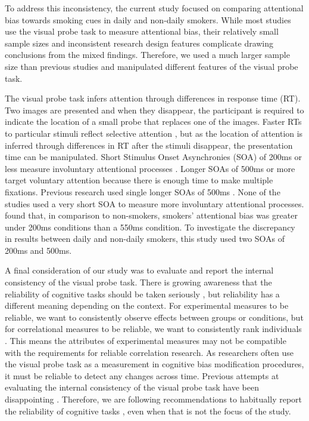 \documentclass[empirical, authordate]{jote-new-article}
\begin{document}
To address this inconsistency, the current study focused on comparing attentional bias towards smoking cues in daily and non-daily smokers. While most studies use the visual probe task to measure attentional bias, their relatively small sample sizes and inconsistent research design features complicate drawing conclusions from the mixed findings. Therefore, we used a much larger sample size than previous studies and manipulated different features of the visual probe task.

The visual probe task infers attention through differences in response time (RT). Two images are presented and when they disappear, the participant is required to indicate the location of a small probe that replaces one of the images. Faster RTs to particular stimuli reflect selective attention \parencite{Field2008}, but as the location of attention is inferred through differences in RT after the stimuli disappear, the presentation time can be manipulated. Short Stimulus Onset Asynchronies (SOA) of 200ms or less measure involuntary attentional processes \parencite{Field2008}. Longer SOAs of 500ms or more target voluntary attention because there is enough time to make multiple fixations. Previous research used single longer SOAs of 500ms \parencite{Vollstädt-Klein2011, Hogarth2003, Mogg2005}. None of the studies used a very short SOA to measure more involuntary attentional processes. \parencite{Chanon2010} found that, in comparison to non-smokers, smokers' attentional bias was greater under 200ms conditions than a 550ms condition. To investigate the discrepancy in results between daily and non-daily smokers, this study used two SOAs of 200ms and 500ms.

A final consideration of our study was to evaluate and report the internal consistency of the visual probe task. There is growing awareness that the reliability of cognitive tasks should be taken seriously \parencite{Parsons2019, Pennington2021}, but reliability has a different meaning depending on the context. For experimental measures to be reliable, we want to consistently observe effects between groups or conditions, but for correlational measures to be reliable, we want to consistently rank individuals \parencite{Hedge2018}. This means the attributes of experimental measures may not be compatible with the requirements for reliable correlation research. As researchers often use the visual probe task as a measurement in cognitive bias modification procedures, it must be reliable to detect any changes across time. Previous attempts at evaluating the internal consistency of the visual probe task have been disappointing \parencite{Ataya2012, Schmukle2005, Waechter2014}. Therefore, we are following recommendations to habitually report the reliability of cognitive tasks \parencite{Parsons2019}, even when that is not the focus of the study.
\end{document}
